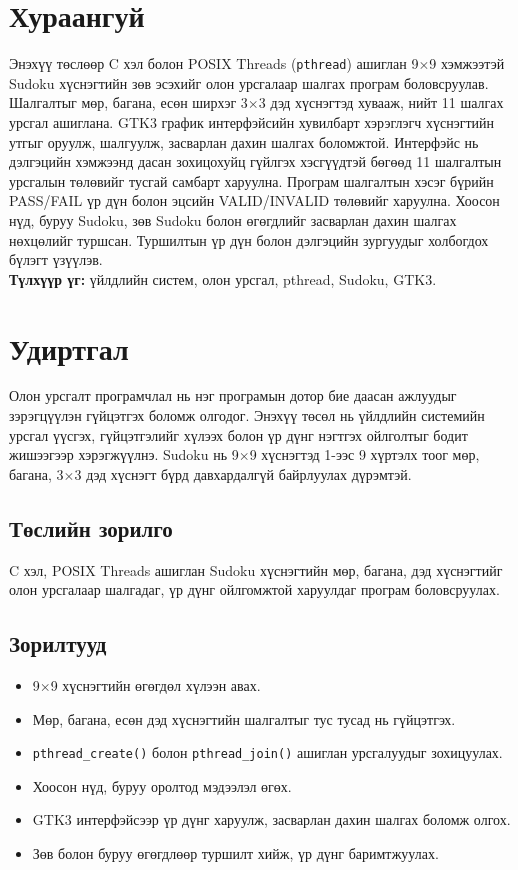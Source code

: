 \documentclass[12pt,a4paper]{report}
\begin{document}
\chapter*{Хураангуй}
Энэхүү төслөөр C хэл болон POSIX Threads (\texttt{pthread}) ашиглан 9$\times$9 хэмжээтэй Sudoku хүснэгтийн зөв эсэхийг олон урсгалаар шалгах програм боловсруулав. Шалгалтыг мөр, багана, есөн ширхэг 3$\times$3 дэд хүснэгтэд хувааж, нийт 11 шалгах урсгал ашиглана. GTK3 график интерфэйсийн хувилбарт хэрэглэгч хүснэгтийн утгыг оруулж, шалгуулж, засварлан дахин шалгах боломжтой. Интерфэйс нь дэлгэцийн хэмжээнд дасан зохицохуйц гүйлгэх хэсгүүдтэй бөгөөд 11 шалгалтын урсгалын төлөвийг тусгай самбарт харуулна. Програм шалгалтын хэсэг бүрийн PASS/FAIL үр дүн болон эцсийн VALID/INVALID төлөвийг харуулна. Хоосон нүд, буруу Sudoku, зөв Sudoku болон өгөгдлийг засварлан дахин шалгах нөхцөлийг туршсан. Туршилтын үр дүн болон дэлгэцийн зургуудыг холбогдох бүлэгт үзүүлэв.\\
\textbf{Түлхүүр үг:} үйлдлийн систем, олон урсгал, pthread, Sudoku, GTK3.

\chapter{Удиртгал}
Олон урсгалт програмчлал нь нэг програмын дотор бие даасан ажлуудыг зэрэгцүүлэн гүйцэтгэх боломж олгодог. Энэхүү төсөл нь үйлдлийн системийн урсгал үүсгэх, гүйцэтгэлийг хүлээх болон үр дүнг нэгтгэх ойлголтыг бодит жишээгээр хэрэгжүүлнэ. Sudoku нь 9$\times$9 хүснэгтэд 1-ээс 9 хүртэлх тоог мөр, багана, 3$\times$3 дэд хүснэгт бүрд давхардалгүй байрлуулах дүрэмтэй.
\section{Төслийн зорилго}
C хэл, POSIX Threads ашиглан Sudoku хүснэгтийн мөр, багана, дэд хүснэгтийг олон урсгалаар шалгадаг, үр дүнг ойлгомжтой харуулдаг програм боловсруулах.
\section{Зорилтууд}
\begin{itemize}
\item 9$\times$9 хүснэгтийн өгөгдөл хүлээн авах.
\item Мөр, багана, есөн дэд хүснэгтийн шалгалтыг тус тусад нь гүйцэтгэх.
\item \texttt{pthread\_create()} болон \texttt{pthread\_join()} ашиглан урсгалуудыг зохицуулах.
\item Хоосон нүд, буруу оролтод мэдээлэл өгөх.
\item GTK3 интерфэйсээр үр дүнг харуулж, засварлан дахин шалгах боломж олгох.
\item Зөв болон буруу өгөгдлөөр туршилт хийж, үр дүнг баримтжуулах.
\end{itemize}
\end{document}
